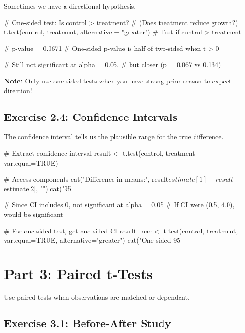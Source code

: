 \documentclass[11pt]{article}
\begin{document}
Sometimes we have a directional hypothesis.

\begin{rcode}
# One-sided test: Is control > treatment?
# (Does treatment reduce growth?)
t.test(control, treatment,
       alternative = "greater")  # Test if control > treatment

# p-value = 0.0671
# One-sided p-value is half of two-sided when t > 0

# Still not significant at alpha = 0.05,
# but closer (p = 0.067 vs 0.134)
\end{rcode}

\textbf{Note:} Only use one-sided tests when you have strong prior reason to expect direction!

\vspace{1cm}

\subsection{Exercise 2.4: Confidence Intervals}

The confidence interval tells us the plausible range for the true difference.

\begin{rcode}
# Extract confidence interval
result <- t.test(control, treatment, var.equal=TRUE)

# Access components
cat("Difference in means:", result$estimate[1] - result$estimate[2], "\n")
cat("95%

# Since CI includes 0, not significant at alpha = 0.05
# If CI were (0.5, 4.0), would be significant

# For one-sided test, get one-sided CI
result_one <- t.test(control, treatment,
                     var.equal=TRUE,
                     alternative="greater")
cat("One-sided 95%
\end{rcode}

\section{Part 3: Paired t-Tests}

Use paired tests when observations are matched or dependent.

\subsection{Exercise 3.1: Before-After Study}
\end{document}

